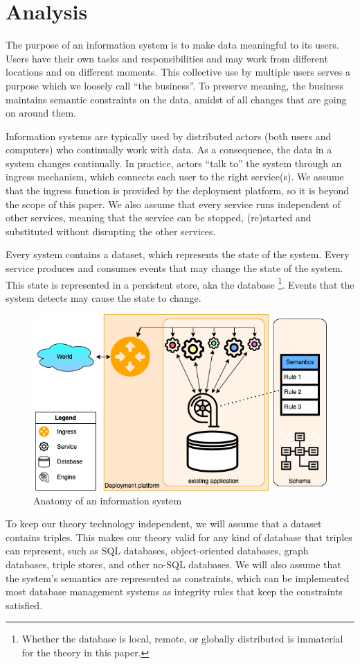 \documentclass{elsarticle}
\begin{document}
\section{Analysis}
   The purpose of an information system is to make data meaningful to its users.
   Users have their own tasks and responsibilities
   and may work from different locations and on different moments.
   This collective use by multiple users serves a purpose which we loosely call ``the business''.
   To preserve meaning, the business maintains semantic constraints on the data,
   amidst of all changes that are going on around them.
   
   Information systems are typically used by distributed actors (both users and computers) who continually work with data.
   As a consequence, the data in a system changes continually.
   In practice, actors ``talk to'' the system through an ingress mechanism, which connects each user to the right service(s).
   We assume that the ingress function is provided by the deployment platform, so it is beyond the scope of this paper.
   We also assume that every service runs independent of other services,
   meaning that the service can be stopped, (re)started and substituted without disrupting the other services.

   Every system contains a dataset, which represents the state of the system.
   Every service produces and consumes events that may change the state of the system.
   This state is represented in a persistent store, aka the database%
\footnote{Whether the database is local, remote, or globally distributed is immaterial for the theory in this paper.}.
   Events that the system detects may cause the state to change.
\begin{figure}[bht]
   \begin{center}
     \includegraphics[scale=.45]{datamigration-Pre-migration.drawio.png}
   \end{center}
\caption{Anatomy of an information system}
\label{fig:pre-migration}
\end{figure}
   To keep our theory technology independent, we will assume that a dataset contains triples.
   This makes our theory valid for any kind of database that triples can represent,
   such as SQL databases, object-oriented databases, graph databases, triple stores, and other no-SQL databases.
   We will also assume that the system's semantics are represented as constraints,
   which can be implemented most database management systems as integrity rules that keep the constraints satisfied.
\end{document}
